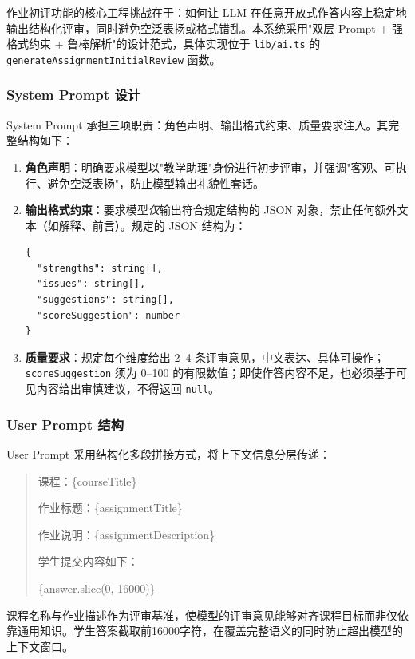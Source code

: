 \documentclass[12pt,a4paper,oneside]{ctexbook}
\numberwithin{equation}{chapter}
\begin{document}
作业初评功能的核心工程挑战在于：如何让 LLM 在任意开放式作答内容上稳定地输出结构化评审，同时避免空泛表扬或格式错乱。本系统采用"双层 Prompt + 强格式约束 + 鲁棒解析"的设计范式，具体实现位于 \texttt{lib/ai.ts} 的 \texttt{generateAssignmentInitialReview} 函数。

\subsubsection{System Prompt 设计}

System Prompt 承担三项职责：角色声明、输出格式约束、质量要求注入。其完整结构如下：

\begin{enumerate}[label=(\arabic*)]
  \item \textbf{角色声明}：明确要求模型以"教学助理"身份进行初步评审，并强调"客观、可执行、避免空泛表扬"，防止模型输出礼貌性套话。
  \item \textbf{输出格式约束}：要求模型\emph{仅}输出符合规定结构的 JSON 对象，禁止任何额外文本（如解释、前言）。规定的 JSON 结构为：
\begin{verbatim}
{
  "strengths": string[],
  "issues": string[],
  "suggestions": string[],
  "scoreSuggestion": number
}
\end{verbatim}
  \item \textbf{质量要求}：规定每个维度给出 2–4 条评审意见，中文表达、具体可操作；\texttt{scoreSuggestion} 须为 0–100 的有限数值；即使作答内容不足，也必须基于可见内容给出审慎建议，不得返回 \texttt{null}。
\end{enumerate}

\subsubsection{User Prompt 结构}

User Prompt 采用结构化多段拼接方式，将上下文信息分层传递：

\begin{quote}
课程：\{courseTitle\}

作业标题：\{assignmentTitle\}

作业说明：\{assignmentDescription\}

学生提交内容如下：

\{answer.slice(0, 16000)\}
\end{quote}

课程名称与作业描述作为评审基准，使模型的评审意见能够对齐课程目标而非仅依靠通用知识。学生答案截取前16000字符，在覆盖完整语义的同时防止超出模型的上下文窗口。
\end{document}
